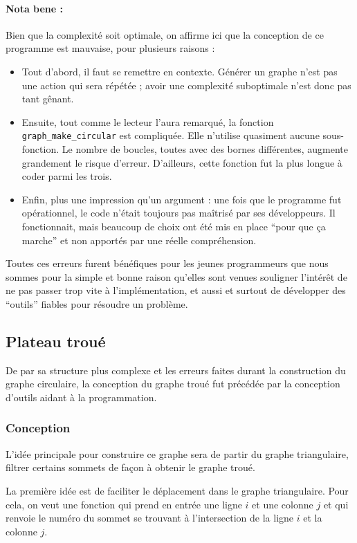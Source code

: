 \paragraph{Nota bene :}
Bien que la complexité soit optimale, on affirme ici que la conception de ce programme est mauvaise, pour plusieurs raisons :
\begin{itemize}
    \item Tout d'abord, il faut se remettre en contexte. Générer un graphe n'est pas une action qui sera répétée ; avoir une complexité suboptimale n'est donc pas tant gênant.
    \item Ensuite, tout comme le lecteur l'aura remarqué, la fonction \texttt{graph\_make\_circular} est compliquée. Elle n'utilise quasiment aucune sous-fonction. Le nombre de boucles, toutes avec des bornes différentes, augmente grandement le risque d'erreur. D'ailleurs, cette fonction fut la plus longue à coder parmi les trois.
    \item Enfin, plus une impression qu'un argument : une fois que le programme fut opérationnel, le code n'était toujours pas maîtrisé par ses développeurs. Il fonctionnait, mais beaucoup de choix ont été mis en place ``pour que ça marche'' et non apportés par une réelle compréhension.
\end{itemize}

Toutes ces erreurs furent bénéfiques pour les jeunes programmeurs que nous sommes pour la simple et bonne raison qu'elles sont venues souligner l'intérêt de ne pas passer trop vite à l'implémentation, et aussi et surtout de développer des ``outils'' fiables pour résoudre un problème.

\subsection{Plateau troué}
De par sa structure plus complexe et les erreurs faites durant la construction du graphe circulaire, la conception du graphe troué fut précédée par la conception d'outils aidant à la programmation.

\subsubsection*{Conception}
L'idée principale pour construire ce graphe sera de partir du graphe triangulaire, filtrer certains sommets de façon à obtenir le graphe troué.

La première idée est de faciliter le déplacement dans le graphe triangulaire. Pour cela, on veut une fonction qui prend en entrée une ligne $i$ et une colonne $j$ et qui renvoie le numéro du sommet se trouvant à l'intersection de la ligne $i$ et la colonne $j$.

